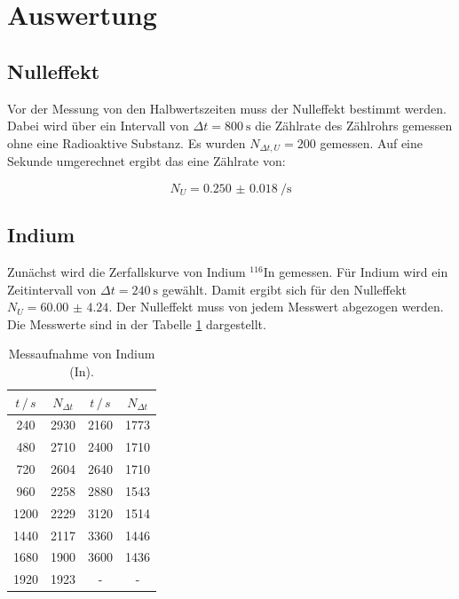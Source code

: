 \section{Auswertung}

\subsection{Nulleffekt}

Vor der Messung von den Halbwertszeiten muss der Nulleffekt bestimmt werden. Dabei
wird über ein Intervall von $\Delta t = \SI{800}{\second}$ die Zählrate des Zählrohrs
gemessen ohne eine Radioaktive Substanz. Es wurden $N_{\Delta t , U} = 200$ gemessen.
Auf eine Sekunde umgerechnet ergibt das eine Zählrate von:

\begin{equation*}
  N_U = \SI{0.250(18)}{\per\second}
\end{equation*}

\subsection{Indium}

Zunächst wird die Zerfallskurve von Indium $^{116}\text{In}$ gemessen. Für Indium wird ein Zeitintervall
von $\Delta t = \SI{240}{\second}$ gewählt. Damit ergibt sich für den Nulleffekt
$N_U = \num{60.00(424)}$. Der Nulleffekt muss von jedem Messwert abgezogen werden.
Die Messwerte sind in der Tabelle \ref{tab:1} dargestellt.

\begin{table}[H]
  \centering
  \caption{Messaufnahme von Indium (In).}
  \label{tab:1}
  \begin{tabular}{c c c c}
    \toprule
    $t \, /\, s$& $N_{\Delta t}$& $t \, /\, s$& $N_{\Delta t}$ \\
    \midrule
    240  &  2930 & 2160 & 1773\\
    480  &  2710 & 2400 & 1710\\
    720  &  2604 & 2640 & 1710\\
    960  &  2258 & 2880 & 1543\\
    1200 &  2229 & 3120 & 1514\\
    1440 &  2117 & 3360 & 1446\\
    1680 &  1900 & 3600 & 1436\\
    1920 &  1923 & - & -\\
    \bottomrule
  \end{tabular}
\end{table}

